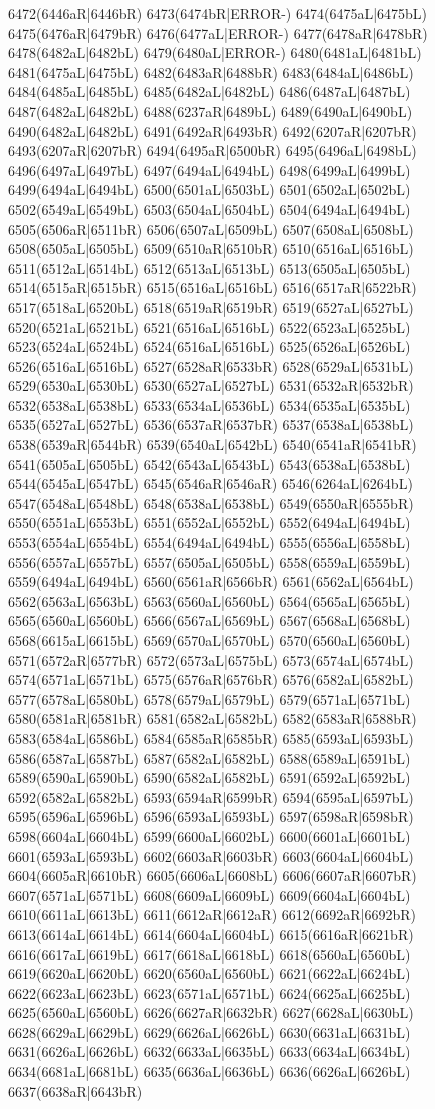 6472(6446aR|6446bR) 6473(6474bR|ERROR-) 6474(6475aL|6475bL) 6475(6476aR|6479bR) 6476(6477aL|ERROR-) 6477(6478aR|6478bR) 6478(6482aL|6482bL) 6479(6480aL|ERROR-) 6480(6481aL|6481bL) 6481(6475aL|6475bL) 6482(6483aR|6488bR) 6483(6484aL|6486bL) 6484(6485aL|6485bL) 6485(6482aL|6482bL) 6486(6487aL|6487bL) 6487(6482aL|6482bL) 6488(6237aR|6489bL) 6489(6490aL|6490bL) 6490(6482aL|6482bL) 6491(6492aR|6493bR) 6492(6207aR|6207bR) 6493(6207aR|6207bR) 6494(6495aR|6500bR) 6495(6496aL|6498bL) 6496(6497aL|6497bL) 6497(6494aL|6494bL) 6498(6499aL|6499bL) 6499(6494aL|6494bL) 6500(6501aL|6503bL) 6501(6502aL|6502bL) 6502(6549aL|6549bL) 6503(6504aL|6504bL) 6504(6494aL|6494bL) 6505(6506aR|6511bR) 6506(6507aL|6509bL) 6507(6508aL|6508bL) 6508(6505aL|6505bL) 6509(6510aR|6510bR) 6510(6516aL|6516bL) 6511(6512aL|6514bL) 6512(6513aL|6513bL) 6513(6505aL|6505bL) 6514(6515aR|6515bR) 6515(6516aL|6516bL) 6516(6517aR|6522bR) 6517(6518aL|6520bL) 6518(6519aR|6519bR) 6519(6527aL|6527bL) 6520(6521aL|6521bL) 6521(6516aL|6516bL) 6522(6523aL|6525bL) 6523(6524aL|6524bL) 6524(6516aL|6516bL) 6525(6526aL|6526bL) 6526(6516aL|6516bL) 6527(6528aR|6533bR) 6528(6529aL|6531bL) 6529(6530aL|6530bL) 6530(6527aL|6527bL) 6531(6532aR|6532bR) 6532(6538aL|6538bL) 6533(6534aL|6536bL) 6534(6535aL|6535bL) 6535(6527aL|6527bL) 6536(6537aR|6537bR) 6537(6538aL|6538bL) 6538(6539aR|6544bR) 6539(6540aL|6542bL) 6540(6541aR|6541bR) 6541(6505aL|6505bL) 6542(6543aL|6543bL) 6543(6538aL|6538bL) 6544(6545aL|6547bL) 6545(6546aR|6546aR) 6546(6264aL|6264bL) 6547(6548aL|6548bL) 6548(6538aL|6538bL) 6549(6550aR|6555bR) 6550(6551aL|6553bL) 6551(6552aL|6552bL) 6552(6494aL|6494bL) 6553(6554aL|6554bL) 6554(6494aL|6494bL) 6555(6556aL|6558bL) 6556(6557aL|6557bL) 6557(6505aL|6505bL) 6558(6559aL|6559bL) 6559(6494aL|6494bL) 6560(6561aR|6566bR) 6561(6562aL|6564bL) 6562(6563aL|6563bL) 6563(6560aL|6560bL) 6564(6565aL|6565bL) 6565(6560aL|6560bL) 6566(6567aL|6569bL) 6567(6568aL|6568bL) 6568(6615aL|6615bL) 6569(6570aL|6570bL) 6570(6560aL|6560bL) 6571(6572aR|6577bR) 6572(6573aL|6575bL) 6573(6574aL|6574bL) 6574(6571aL|6571bL) 6575(6576aR|6576bR) 6576(6582aL|6582bL) 6577(6578aL|6580bL) 6578(6579aL|6579bL) 6579(6571aL|6571bL) 6580(6581aR|6581bR) 6581(6582aL|6582bL) 6582(6583aR|6588bR) 6583(6584aL|6586bL) 6584(6585aR|6585bR) 6585(6593aL|6593bL) 6586(6587aL|6587bL) 6587(6582aL|6582bL) 6588(6589aL|6591bL) 6589(6590aL|6590bL) 6590(6582aL|6582bL) 6591(6592aL|6592bL) 6592(6582aL|6582bL) 6593(6594aR|6599bR) 6594(6595aL|6597bL) 6595(6596aL|6596bL) 6596(6593aL|6593bL) 6597(6598aR|6598bR) 6598(6604aL|6604bL) 6599(6600aL|6602bL) 6600(6601aL|6601bL) 6601(6593aL|6593bL) 6602(6603aR|6603bR) 6603(6604aL|6604bL) 6604(6605aR|6610bR) 6605(6606aL|6608bL) 6606(6607aR|6607bR) 6607(6571aL|6571bL) 6608(6609aL|6609bL) 6609(6604aL|6604bL) 6610(6611aL|6613bL) 6611(6612aR|6612aR) 6612(6692aR|6692bR) 6613(6614aL|6614bL) 6614(6604aL|6604bL) 6615(6616aR|6621bR) 6616(6617aL|6619bL) 6617(6618aL|6618bL) 6618(6560aL|6560bL) 6619(6620aL|6620bL) 6620(6560aL|6560bL) 6621(6622aL|6624bL) 6622(6623aL|6623bL) 6623(6571aL|6571bL) 6624(6625aL|6625bL) 6625(6560aL|6560bL) 6626(6627aR|6632bR) 6627(6628aL|6630bL) 6628(6629aL|6629bL) 6629(6626aL|6626bL) 6630(6631aL|6631bL) 6631(6626aL|6626bL) 6632(6633aL|6635bL) 6633(6634aL|6634bL) 6634(6681aL|6681bL) 6635(6636aL|6636bL) 6636(6626aL|6626bL) 6637(6638aR|6643bR) 